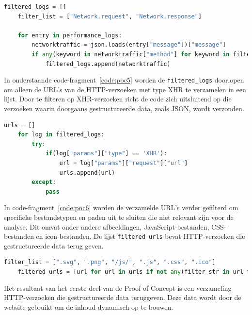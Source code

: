 \begin{lstlisting}[language=python, captionpos=b, caption={Filteren van performance-logs }, label={code:poc4}]
    filtered_logs = []
    filter_list = ["Network.request", "Network.response"]

    for entry in performance_logs:
        networktraffic = json.loads(entry["message"])["message"]
        if any(keyword in networktraffic["method"] for keyword in filter_list):
            filtered_logs.append(networktraffic)
\end{lstlisting}

In onderstaande code-fragment~\ref{code:poc5}  worden de \texttt{filtered\_logs} doorlopen om alleen de URL's van de HTTP-verzoeken met type XHR te verzamelen in een lijst. Door te filteren op XHR-verzoeken richt de code zich uitsluitend op die verzoeken waarin doorgaans gestructureerde data, zoals JSON, wordt verzonden.

\begin{lstlisting}[language=python, captionpos=b, caption={De URL's uit de HTTP-verzoeken halen}, label={code:poc5},]
    urls = []
    for log in filtered_logs:
        try:
            if(log["params"]["type"] == 'XHR'):
                url = log["params"]["request"]["url"]
                urls.append(url)
        except:
            pass
\end{lstlisting}


In code-fragment~\ref{code:poc6} worden de verzamelde URL's verder gefilterd om specifieke bestandstypen en paden uit te sluiten die niet relevant zijn voor de analyse. Dit omvat onder andere afbeeldingen, JavaScript-bestanden, CSS-bestanden en icon-bestanden. De lijst \texttt{filtered\_urls} bevat HTTP-verzoeken die gestructureerde data terug geven.
\begin{lstlisting}[language=python, captionpos=b, caption={Ongewenste bestanden filteren}, label={code:poc6}]
    filter_list = [".svg", ".png", "/js/", ".js", ".css", ".ico"]
    filtered_urls = [url for url in urls if not any(filter_str in url for filter_str in filter_list)]
\end{lstlisting}

Het resultaat van het eerste deel van de Proof of Concept is een verzameling HTTP-verzoeken die gestructureerde data teruggeven. Deze data wordt door de website gebruikt om de inhoud dynamisch op te bouwen.

